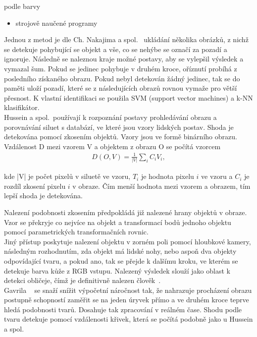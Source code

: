 podle barvy
\begin{itemize}
\item strojově naučené programy\\
\end{itemize}


Jednou z metod je dle Ch. Nakajima a spol.~\cite{6} ukládání několika obrázků, z nichž se detekuje pohybující se objekt a vše, co se nehýbe se označí za pozadí a ignoruje. Následně se naleznou kraje možné postavy, aby se vylepšil výsledek a vymazal šum. Pokud se jedinec pohybuje v druhém kroce, oříznutí probíhá z posledního získaného obrazu. Pokud nebyl detekován žádný jedinec, tak se do paměti uloží pozadí, které se z následujících obrazů rovnou vymaže pro větší přesnost. K vlastní identifikaci se použila SVM (support vector machines) a k-NN klasifikátor.\\

Hussein a spol.~\cite{9}používají k rozpoznání postavy prohledávání obrazu a porovnávání siluet s databází, ve které jsou vzory lidských postav. Shoda je detekována pomocí zkosením objektů. Vzory jsou ve formě binárního obrazu. Vzdálenost D mezi vzorem V a objektem z obrazu O se počítá vzorcem\\

\begin{eqnarray}
 D(O,V) = \frac{1}{|V|}\sum_{i}^{}C_{i}V_{i}   ,
\end{eqnarray}

kde |V| je počet pixelů v siluetě ve vzoru, $ T_{i} $ je hodnota pixelu $ i $ ve vzoru a $ C_{i} $ je rozdíl zkosení pixelu $ i $ v obraze. Čím menší hodnota mezi vzorem a obrazem, tím lepší shoda je detekována.

Nalezení podobnosti zkosením předpokládá již nalezené hrany objektů v obraze. Vzor se překryje co nejvíce na objekt a transformací bodů jednoho objektu pomocí parametrických transformačních rovnic.\\

Jiný přístup poskytuje nalezení objektu v zorném poli pomocí hloubkové kamery, následným rozhodnutím, zda objekt má lidské nohy, nebo aspoň dva objekty odpovídající tvaru, a pokud ano, tak se přejde k dalšímu kroku, ve kterém se detekuje barva kůže z RGB vstupu. Nalezený výsledek slouží jako oblast k detekci obličeje, čímž je definitivně nalezen člověk~\cite{10}.\\

Gavrila ~\cite{7} se snaží snížit výpočetní náročnost tak, že nahrazuje procházení obrazu postupně schopností zaměřit se na jeden úryvek přímo a ve druhém kroce teprve hledá podobnosti tvarů. Dosahuje tak zpracování v reálném čase.
Shodu podle tvaru detekuje pomocí vzdálenosti křivek, která se počítá podobně jako u Hussein a spol.~\cite{9} 

